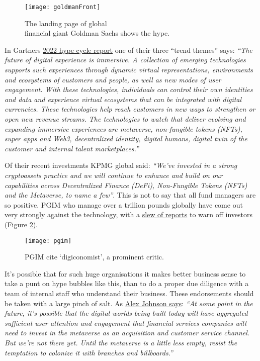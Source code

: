 \begin{figure}[ht]\centering %
	\texttt{[image: goldmanFront]}
	\caption{The landing page of global\\financial giant Goldman Sachs shows the hype.}
	\label{fig:goldmanFront}
\end{figure}
In Gartners \href{https://www.itp.net/emergent-tech/gartner-says-nfts-metaverse-web3-will-expand-immersive-experiences}{2022 hype cycle report} one of their three ``trend themes'' says: \textit{``The future of digital experience is immersive. A collection of emerging technologies supports such experiences through dynamic virtual representations, environments and ecosystems of customers and people, as well as new modes of user engagement. With these technologies, individuals can control their own identities and data and experience virtual ecosystems that can be integrated with digital currencies. These technologies help reach customers in new ways to strengthen or open new revenue streams.
The technologies to watch that deliver evolving and expanding immersive experiences are metaverse, non-fungible tokens (NFTs), super apps and Web3, decentralized identity, digital humans, digital twin of the customer and internal talent marketplaces.''}\par
Of their recent investments KPMG global said: \textit{``We've invested in a strong cryptoassets practice and we will continue to enhance and build on our capabilities across Decentralized Finance (DeFi), Non-Fungible Tokens (NFTs) and the Metaverse, to name a few''}. This is not to say that all fund managers are so positive. PGIM who manage over a trillion pounds globally have come out very strongly against the technology, with a \href{https://www.pgim.com/megatrends/cryptocurrency-investing/bitcoin?}{slew of reports} to warn off investors (Figure \ref{fig:pgim}).\par
\begin{figure}[ht]\centering 	\texttt{[image: pgim]}
	\caption{PGIM cite `digiconomist', a prominent critic.}
	\label{fig:pgim}
\end{figure}
It's possible that for such huge organisations it makes better business sense to take a punt on hype bubbles like this, than to do a proper due diligence with a team of internal staff who understand their business. These endorsements should be taken with a large pinch of salt. As \href{https://newsletter.fintechtakes.com/p/metaverse-branches?s=r}{Alex Johnson says}: \textit{``At some point in the future, it’s possible that the digital worlds being built today will have aggregated sufficient user attention and engagement that financial services companies will need to invest in the metaverse as an acquisition and customer service channel. But we’re not there yet. Until the metaverse is a little less empty, resist the temptation to colonize it with branches and billboards.''}\par
